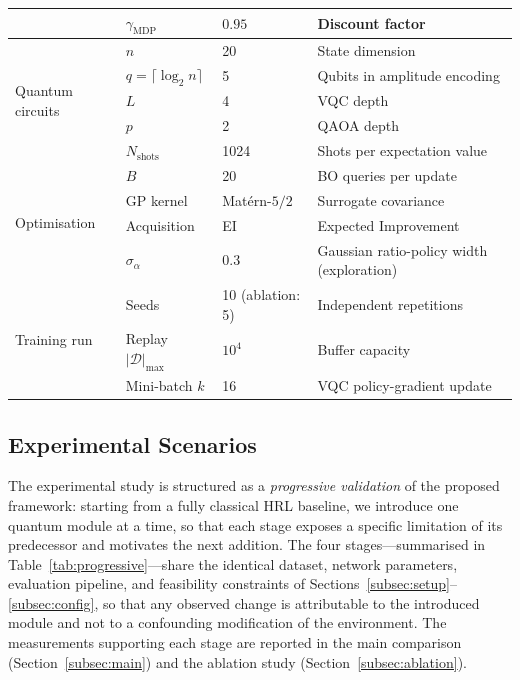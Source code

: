 \documentclass[11pt,a4paper]{article}
\theoremstyle{definition}
\begin{document}
\begin{table}[t]
\begin{tabular}{@{}llll@{}}
  & $\gamma_{\mathrm{MDP}}$ & $0.95$ & Discount factor \\
\midrule
\multirow{5}{*}{Quantum circuits}
  & $n$ & 20 & State dimension \\
  & $q=\lceil\log_2 n\rceil$ & 5 & Qubits in amplitude encoding \\
  & $L$ & 4 & VQC depth \\
  & $p$ & 2 & QAOA depth \\
  & $N_{\mathrm{shots}}$ & 1024 & Shots per expectation value \\
\midrule
\multirow{4}{*}{Optimisation}
  & $B$ & 20 & BO queries per update \\
  & GP kernel & Mat\'ern-$5/2$ & Surrogate covariance \\
  & Acquisition & EI & Expected Improvement \\
  & $\sigma_\alpha$ & $0.3$ & Gaussian ratio-policy width (exploration) \\
\midrule
\multirow{3}{*}{Training run}
  & Seeds & 10 (ablation: 5) & Independent repetitions \\
  & Replay $|\mathcal{D}|_{\max}$ & $10^4$ & Buffer capacity \\
  & Mini-batch $k$ & 16 & VQC policy-gradient update \\
\bottomrule
\end{tabular}
\end{table}

\subsection{Experimental Scenarios}
\label{subsec:scenarios}

The experimental study is structured as a \emph{progressive validation} of the proposed framework: starting from a fully classical HRL baseline, we introduce one quantum module at a time, so that each stage exposes a specific limitation of its predecessor and motivates the next addition. The four stages---summarised in Table~\ref{tab:progressive}---share the identical dataset, network parameters, evaluation pipeline, and feasibility constraints of Sections~\ref{subsec:setup}--\ref{subsec:config}, so that any observed change is attributable to the introduced module and not to a confounding modification of the environment. The measurements supporting each stage are reported in the main comparison (Section~\ref{subsec:main}) and the ablation study (Section~\ref{subsec:ablation}).
\end{document}
